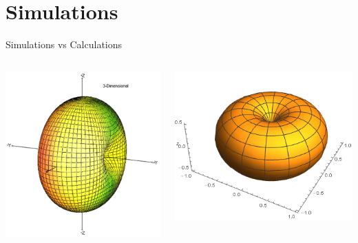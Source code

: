 \documentclass{beamer}
\begin{document}
\section{Simulations}
\begin{frame}{Simulations vs Calculations}
\begin{columns}[T]
\begin{column}{0.5\textwidth}
\includegraphics[scale=0.5]{simulation.png}
\end{column}
\begin{column}{0.5\textwidth}
\includegraphics[scale=0.45]{3d.png}
\end{column}
\end{columns}

\end{frame}

\end{document}
